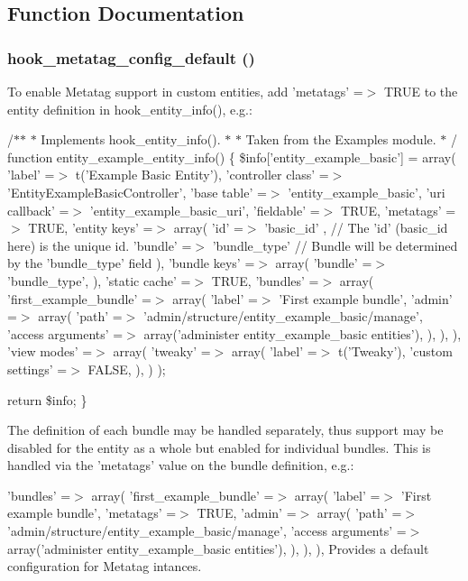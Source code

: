\subsection{Function Documentation}
\hypertarget{metatag_8api_8php_a4e5a48ac435a77ef5372964d28ad7c36}{
\subsubsection[{hook\_\-metatag\_\-config\_\-default}]{\setlength{\rightskip}{0pt plus 5cm}hook\_\-metatag\_\-config\_\-default ()}}
\label{metatag_8api_8php_a4e5a48ac435a77ef5372964d28ad7c36}
To enable Metatag support in custom entities, add 'metatags' =$>$ TRUE to the entity definition in hook\_\-entity\_\-info(), e.g.:

/$\ast$$\ast$ $\ast$ Implements hook\_\-entity\_\-info(). $\ast$ $\ast$ Taken from the Examples module. $\ast$ / function entity\_\-example\_\-entity\_\-info() \{ \$info\mbox{[}'entity\_\-example\_\-basic'\mbox{]} = array( 'label' =$>$ t('Example Basic Entity'), 'controller class' =$>$ 'EntityExampleBasicController', 'base table' =$>$ 'entity\_\-example\_\-basic', 'uri callback' =$>$ 'entity\_\-example\_\-basic\_\-uri', 'fieldable' =$>$ TRUE, 'metatags' =$>$ TRUE, 'entity keys' =$>$ array( 'id' =$>$ 'basic\_\-id' , // The 'id' (basic\_\-id here) is the unique id. 'bundle' =$>$ 'bundle\_\-type' // Bundle will be determined by the 'bundle\_\-type' field ), 'bundle keys' =$>$ array( 'bundle' =$>$ 'bundle\_\-type', ), 'static cache' =$>$ TRUE, 'bundles' =$>$ array( 'first\_\-example\_\-bundle' =$>$ array( 'label' =$>$ 'First example bundle', 'admin' =$>$ array( 'path' =$>$ 'admin/structure/entity\_\-example\_\-basic/manage', 'access arguments' =$>$ array('administer entity\_\-example\_\-basic entities'), ), ), ), 'view modes' =$>$ array( 'tweaky' =$>$ array( 'label' =$>$ t('Tweaky'), 'custom settings' =$>$ FALSE, ), ) );

return \$info; \}

The definition of each bundle may be handled separately, thus support may be disabled for the entity as a whole but enabled for individual bundles. This is handled via the 'metatags' value on the bundle definition, e.g.:

'bundles' =$>$ array( 'first\_\-example\_\-bundle' =$>$ array( 'label' =$>$ 'First example bundle', 'metatags' =$>$ TRUE, 'admin' =$>$ array( 'path' =$>$ 'admin/structure/entity\_\-example\_\-basic/manage', 'access arguments' =$>$ array('administer entity\_\-example\_\-basic entities'), ), ), ), Provides a default configuration for Metatag intances.

